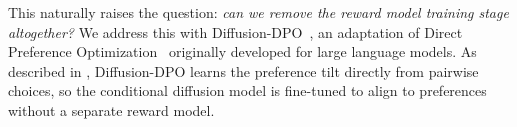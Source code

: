 This naturally raises the question: \emph{can we remove the reward model training stage altogether?} We address this with Diffusion-DPO~\citep{wallace2024diffusion}, an adaptation of Direct Preference Optimization~\citep{rafailov2023direct} originally developed for large language models. As described in , Diffusion-DPO learns the preference tilt directly from pairwise choices, so the conditional diffusion model is fine-tuned to align to preferences without a separate reward model.






